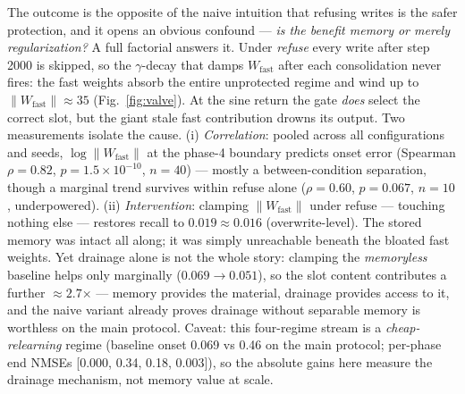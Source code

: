 \documentclass[11pt]{article}
\begin{document}
\begin{table}[t]
\centering\small
\caption{Saturation mini-ablation, 10 seeds ($S{=}2$ grid plus
$S{=}3$). Clamp $R{=}3.18$ = median $\|W_{\mathrm{fast}}\|$ over the
overwrite run after phase 1, calibrated on seed 0 --- a single-seed
trajectory median, acceptable here because refuse norms are an order
of magnitude larger, so the comparison is insensitive to the exact
radius. Refuse collapses to baseline; a bare norm clamp restores
recall almost completely.}
\label{tab:table5}

\end{table}

The outcome is the opposite of the naive intuition that refusing
writes is the safer protection, and it opens an obvious confound ---
\emph{is the benefit memory or merely regularization?} A full factorial
answers it. Under \emph{refuse} every write after step 2000 is skipped, so
the \(\gamma\)-decay that damps \(W_{\mathrm{fast}}\) after each
consolidation never fires: the fast weights absorb the entire
unprotected regime and wind up to \(\|W_{\mathrm{fast}}\|\approx35\)
(Fig.~\ref{fig:valve}). At the sine return the gate \emph{does} select the correct slot,
but the giant stale fast contribution drowns its output. Two
measurements isolate the cause. (i) \emph{Correlation}: pooled across all
configurations and seeds, \(\log\|W_{\mathrm{fast}}\|\) at the
phase-4 boundary predicts onset error (Spearman \(\rho{=}0.82\),
\(p{=}1.5\times10^{-10}\), \(n{=}40\)) --- mostly a between-condition
separation, though a marginal trend survives within refuse alone
(\(\rho{=}0.60\), \(p{=}0.067\), \(n{=}10\), underpowered).
(ii) \emph{Intervention}: clamping
\(\|W_{\mathrm{fast}}\|\) under refuse --- touching nothing else ---
restores recall to \(0.019\approx 0.016\) (overwrite-level). The stored
memory was intact all along; it was simply unreachable beneath the
bloated fast weights. Yet drainage alone is not the whole story:
clamping the \emph{memoryless} baseline helps only marginally
(\(0.069\to0.051\)), so the slot content contributes a further
\(\approx 2.7\)× --- memory provides the material, drainage provides
access to it, and the naive variant already proves drainage without
separable memory is worthless on the main protocol. Caveat: this
four-regime stream is a \emph{cheap-relearning} regime (baseline onset
0.069 vs 0.46 on the main protocol; per-phase end NMSEs
{[}0.000, 0.34, 0.18, 0.003{]}), so the absolute gains here measure the
drainage mechanism, not memory value at scale.
\end{document}
